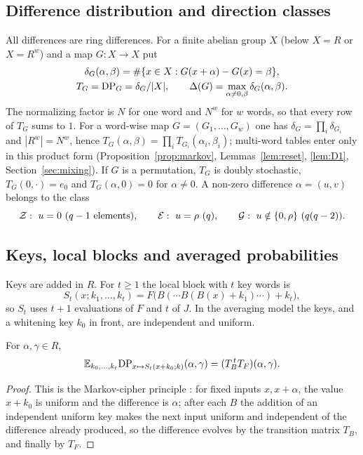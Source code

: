\subsection{Difference distribution and direction classes}
All differences are ring differences. For a finite abelian group $X$ (below $X=R$ or $X=R^w$) and a map
$G:X\to X$ put
\begin{gather*}
\delta_G(\alpha,\beta)=\#\{x\in X: G(x+\alpha)-G(x)=\beta\},\\
T_G=\mathrm{DP}_G=\delta_G/|X|,\qquad \Delta(G)=\max_{\alpha\ne0,\beta}\delta_G(\alpha,\beta).
\end{gather*}
The normalizing factor is $N$ for one word and $N^w$ for $w$ words, so that every row of $T_G$ sums to $1$.
For a word-wise map $G=(G_1,\dots,G_w)$ one has $\delta_G=\prod_i\delta_{G_i}$ and $|R^w|=N^w$, hence
$T_G(\alpha,\beta)=\prod_iT_{G_i}(\alpha_i,\beta_i)$; multi-word tables enter only in this product form
(Proposition~\ref{prop:markov}, Lemmas~\ref{lem:reset}, \ref{lem:D1}, Section~\ref{sec:mixing}). If $G$ is a permutation, $T_G$ is doubly stochastic, $T_G(0,\cdot)=e_0$ and $T_G(\alpha,0)=0$ for $\alpha\ne0$.
A non-zero difference $\alpha=(u,v)$ belongs to the class
\[
\cZ:\ u=0\ (q-1\text{ elements}),\qquad \cE:\ u=\rho\ (q),\qquad \cG:\ u\notin\{0,\rho\}\ (q(q-2)).
\]

\subsection{Keys, local blocks and averaged probabilities}
Keys are added in $R$. For $t\ge1$ the local block with $t$ key words is
\[
S_t(x;k_1,\dots,k_t)=F\bigl(B(\cdots B(B(x)+k_1)\cdots)+k_t\bigr),
\]
so $S_t$ uses $t+1$ evaluations of $F$ and $t$ of $J$. In the averaging model the keys, and a
whitening key $k_0$ in front, are independent and uniform.

\begin{proposition}\label{prop:markov}
For $\alpha,\gamma\in R$,
\[\mathbb{E}_{k_0,\dots,k_t}\mathrm{DP}_{x\mapsto S_t(x+k_0;k)}(\alpha,\gamma)=(T_B^{\,t}T_F)(\alpha,\gamma).\]
\end{proposition}
\begin{proof}
This is the Markov-cipher principle \cite{LMM}: for fixed inputs $x,x+\alpha$, the value $x+k_0$
is uniform and the difference is $\alpha$; after each $B$ the addition of an independent uniform key
makes the next input uniform and independent of the difference already produced, so the
difference evolves by the transition matrix $T_B$, and finally by $T_F$.
\end{proof}


